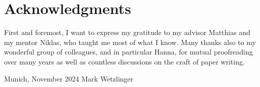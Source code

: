 \chapter*{Acknowledgments}

First and foremost, I want to express my gratitude to my advisor Matthias and my mentor Niklas, who taught me most of what I know.
Many thanks also to my wonderful group of colleagues, and in particular Hanna, for mutual proofreading over many years as well as countless discussions on the craft of paper writing.

\bigskip

\noindent Munich, November 2024 \hfill Mark Wetzlinger%